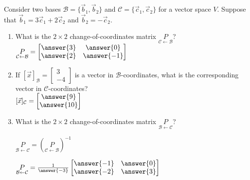 \documentclass{ximera}
\begin{document}
  	  		    \begin{question} Consider two bases $\mathcal{B} =\{\vec{b}_1,\vec{b}_2\}$ and $\mathcal{C} =\{\vec{c}_1,\vec{c}_2\}$ for a vector space $V$. Suppose that $\vec{b}_1 = 3\vec{c}_1+2\vec{c}_2$ and $\vec{b}_2 = -\vec{c}_2$. 
  	  		    	
  	  		    	\begin{enumerate}
  	  		    		\item What is the $2\times 2$ change-of-coordinates matrix 	$\underset{\mathcal{C}\leftarrow \mathcal{B}}{P}$?\\
  	  		    		
  	  		    		$\underset{\mathcal{C}\leftarrow \mathcal{B}}{P}=	\begin{bmatrix} \answer{3} &\answer{0}\\ \answer{2} &\answer{-1}\end{bmatrix}$\\
  	  		    		
  	  		    		\item If $[\vec{x}]_{\mathcal{B}} = \begin{bmatrix}3\\-4\end{bmatrix}$ is a vector in $\mathcal{B}$-coordinates, what is the corresponding vector in $\mathcal{C}$-coordinates?\\
  	  		    		
  	  		    		$[\vec{x}]_{\mathcal{C}} = \begin{bmatrix}\answer{9}\\\answer{10}\end{bmatrix}$\\
  	  		    		
  	  		    		\item What is the $2\times 2$ change-of-coordinates matrix 	$\underset{\mathcal{B}\leftarrow \mathcal{C}}{P}$?\\
  	  		    		
  	  		    		\begin{hint}
  	  		    			$\underset{\mathcal{B}\leftarrow \mathcal{C}}{P} = \left(\underset{\mathcal{C}\leftarrow \mathcal{B}}{P}\right)^{-1}$
  	  		    			\end{hint}
  	  		    			
  	  		    			$\underset{\mathcal{B}\leftarrow \mathcal{C}}{P} = \frac{1}{\answer{-3}}\begin{bmatrix} \answer{-1} &\answer{0}\\ \answer{-2} &\answer{3}\end{bmatrix}$\\
  	  		    	\end{enumerate}
  	  		    
  	  		    
  	  		    	
  	  		    \end{question}	
\end{document}
